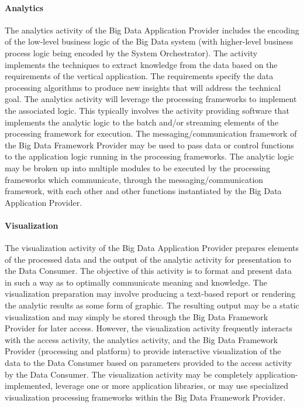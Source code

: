 \documentclass[9pt,]{article}
\let\oldparagraph\paragraph
\renewcommand{\paragraph}[1]{\oldparagraph{#1}\mbox{}}
\begin{document}
\hypertarget{analytics}{%
\paragraph{Analytics}\label{analytics}}

The analytics activity of the Big Data Application Provider includes the
encoding of the low-level business logic of the Big Data system (with
higher-level business process logic being encoded by the System
Orchestrator). The activity implements the techniques to extract
knowledge from the data based on the requirements of the vertical
application. The requirements specify the data processing algorithms to
produce new insights that will address the technical goal. The analytics
activity will leverage the processing frameworks to implement the
associated logic. This typically involves the activity providing
software that implements the analytic logic to the batch and/or
streaming elements of the processing framework for execution. The
messaging/communication framework of the Big Data Framework Provider may
be used to pass data or control functions to the application logic
running in the processing frameworks. The analytic logic may be broken
up into multiple modules to be executed by the processing frameworks
which communicate, through the messaging/communication framework, with
each other and other functions instantiated by the Big Data Application
Provider.

\hypertarget{visualization}{%
\paragraph{Visualization}\label{visualization}}

The visualization activity of the Big Data Application Provider prepares
elements of the processed data and the output of the analytic activity
for presentation to the Data Consumer. The objective of this activity is
to format and present data in such a way as to optimally communicate
meaning and knowledge. The visualization preparation may involve
producing a text-based report or rendering the analytic results as some
form of graphic. The resulting output may be a static visualization and
may simply be stored through the Big Data Framework Provider for later
access. However, the visualization activity frequently interacts with
the access activity, the analytics activity, and the Big Data Framework
Provider (processing and platform) to provide interactive visualization
of the data to the Data Consumer based on parameters provided to the
access activity by the Data Consumer. The visualization activity may be
completely application-implemented, leverage one or more application
libraries, or may use specialized visualization processing frameworks
within the Big Data Framework Provider.
\end{document}
